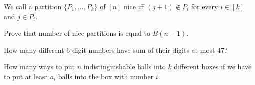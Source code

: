 \documentclass[addpoints,answers]{exam}
\begin{document}
    \pagestyle{headandfoot}
    \runningheadrule

    \firstpagefooter{}{}{}
    \runningfooter{}{}{}
    \begin{flushright}

        \vspace{0.2in}

    \end{flushright}

    \begin{questions}
        \question
            We call a partition $\{P_1, \dots, P_k\}$ of $[n]$ nice iff $(j + 1) \not\in
            P_i$ for every $i \in [k]$ and $j \in P_i$.
            
            Prove that number of nice partitions is equal to $B(n - 1)$.
            \begin{solutionorbox}[\stretch{1}]
            \end{solutionorbox}
            \newpage
 
        \question
            How many different $6$-digit numbers have sum of their digits at most $47$?
            \begin{solutionorbox}[\stretch{1}]
            \end{solutionorbox}
            \newpage
 
        \question
            How many ways to put $n$ indistinguishable balls into $k$ different boxes if we
            have to put at least $a_i$ balls into the box with number $i$.
            \begin{solutionorbox}[\stretch{1}]
            \end{solutionorbox}
            \newpage
 
\end{questions}
\end{document}
